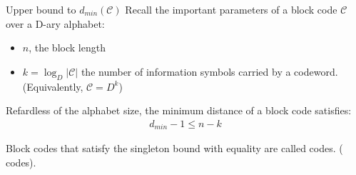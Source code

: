 \begin{parag}{Upper bound to $d_{min}\left(\mathcal{C}\right)$}
    Recall the important parameters of a block code $\mathcal{C}$ over a D-ary alphabet:
    \begin{itemize}
        \item $n$, the block length
        \item $k =  \log_D \left|\mathcal{C}\right|$ the number of information symbols carried by a codeword. (Equivalently, $\mathcal{C} = D^k$)
    \end{itemize}
    
    \begin{theoreme}
    Refardless of the alphabet size, the minimum distance of a block code satisfies:
    \begin{align*} d_{min} - 1 \leq n-k \end{align*}
    \end{theoreme}
    Block codes that satisfy the singleton bound with equality are called  codes. ( codes).
\end{parag}

